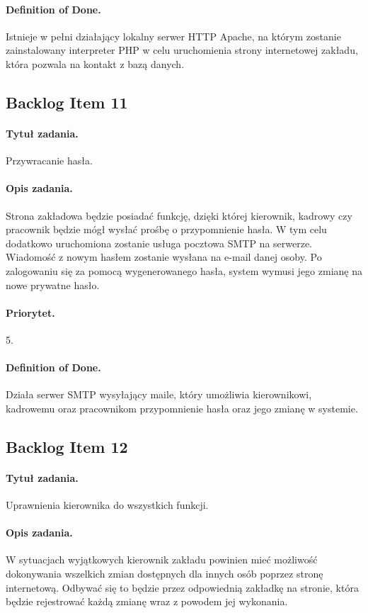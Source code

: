 \documentclass[a4paper]{article}
\begin{document}
\paragraph{Definition of Done.} Istnieje w pełni działający lokalny serwer HTTP Apache, na którym zostanie zainstalowany interpreter PHP w celu uruchomienia strony internetowej zakładu, która pozwala na kontakt z bazą danych.

\subsection{Backlog Item 11}
\paragraph{Tytuł zadania.} Przywracanie hasła.
\paragraph{Opis zadania.} Strona zakładowa będzie posiadać funkcję, dzięki której kierownik, kadrowy czy pracownik będzie mógł wysłać prośbę o przypomnienie hasła. W tym celu dodatkowo uruchomiona zostanie usługa pocztowa SMTP na serwerze. Wiadomość z nowym hasłem zostanie wysłana na e-mail danej osoby. Po zalogowaniu się za pomocą wygenerowanego hasła, system wymusi jego zmianę na nowe prywatne hasło.
\paragraph{Priorytet.} 5.
\paragraph{Definition of Done.} Działa serwer SMTP wysyłający maile, który umożliwia kierownikowi, kadrowemu oraz pracownikom przypomnienie hasła oraz jego zmianę w systemie.

\subsection{Backlog Item 12}
\paragraph{Tytuł zadania.} Uprawnienia kierownika do wszystkich funkcji.
\paragraph{Opis zadania.} W sytuacjach wyjątkowych kierownik zakładu powinien mieć możliwość dokonywania wszelkich zmian dostępnych dla innych osób poprzez stronę internetową. Odbywać się to będzie przez odpowiednią zakładkę na stronie, która będzie rejestrować każdą zmianę wraz z powodem jej wykonania.
\end{document}
